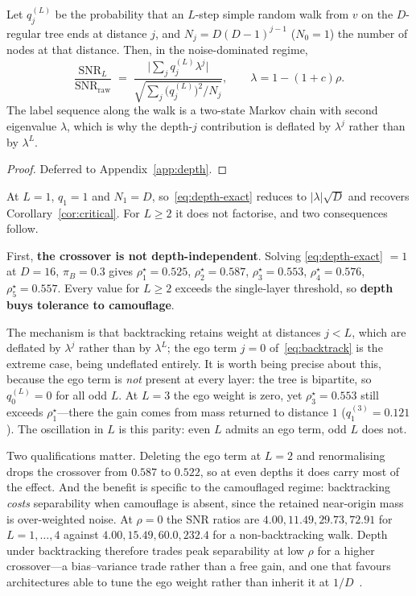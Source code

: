 \documentclass[../elsevier.tex]{subfiles}
\begin{document}
\begin{theorem}[Depth]
\label{thm:depth}
Let $q^{(L)}_j$ be the probability that an $L$-step simple random walk from $v$ on
the $D$-regular tree ends at distance $j$, and $N_j = D(D-1)^{j-1}$ ($N_0=1$) the
number of nodes at that distance. Then, in the noise-dominated regime,
\begin{equation}
    \frac{\mathrm{SNR}_L}{\mathrm{SNR}_{\mathrm{raw}}}
    \;=\;
    \frac{\bigl|\sum_j q^{(L)}_j \lambda^{j}\bigr|}
         {\sqrt{\sum_j \bigl(q^{(L)}_j\bigr)^2 / N_j}},
    \qquad \lambda = 1-(1+c)\rho .
    \label{eq:depth-exact}
\end{equation}
The label sequence along the walk is a two-state Markov chain with second
eigenvalue $\lambda$, which is why the depth-$j$ contribution is deflated by
$\lambda^{j}$ rather than by $\lambda^{L}$.
\end{theorem}

\begin{proof}
Deferred to Appendix~\ref{app:depth}.
\end{proof}

At $L=1$, $q_1 = 1$ and $N_1 = D$, so~\eqref{eq:depth-exact} reduces to
$|\lambda|\sqrt D$ and recovers Corollary~\ref{cor:critical}. For $L \geq 2$ it does
not factorise, and two consequences follow.

First, \textbf{the crossover is not depth-independent}. Solving
\eqref{eq:depth-exact} $= 1$ at $D=16$, $\pi_B = 0.3$ gives
$\rho^\star_1 = 0.525$, $\rho^\star_2 = 0.587$, $\rho^\star_3 = 0.553$,
$\rho^\star_4 = 0.576$, $\rho^\star_5 = 0.557$. Every value for $L\geq2$ exceeds the
single-layer threshold, so \textbf{depth buys tolerance to camouflage}.

The mechanism is that backtracking retains weight at distances $j < L$, which are
deflated by $\lambda^{j}$ rather than by $\lambda^{L}$; the ego term $j=0$
of~\eqref{eq:backtrack} is the extreme case, being undeflated entirely. It is worth
being precise about this, because the ego term is \emph{not} present at every layer:
the tree is bipartite, so $q^{(L)}_0 = 0$ for all odd $L$. At $L=3$ the ego weight is
zero, yet $\rho^\star_3 = 0.553$ still exceeds $\rho^\star_1$---there the gain comes
from mass returned to distance $1$ ($q^{(3)}_1 = 0.121$). The oscillation in $L$ is
this parity: even $L$ admits an ego term, odd $L$ does not.

Two qualifications matter. Deleting the ego term at $L=2$ and renormalising drops the
crossover from $0.587$ to $0.522$, so at even depths it does carry most of the effect.
And the benefit is specific to the camouflaged regime: backtracking \emph{costs}
separability when camouflage is absent, since the retained near-origin mass is
over-weighted noise. At $\rho=0$ the SNR ratios are $4.00, 11.49, 29.73, 72.91$ for
$L=1,\dots,4$ against $4.00, 15.49, 60.0, 232.4$ for a non-backtracking walk. Depth
under backtracking therefore trades peak separability at low $\rho$ for a higher
crossover---a bias--variance trade rather than a free gain, and one that favours
architectures able to tune the ego weight rather than inherit it at
$1/D$~\citep{zhu2020beyond,zhu2022how}.
\end{document}
